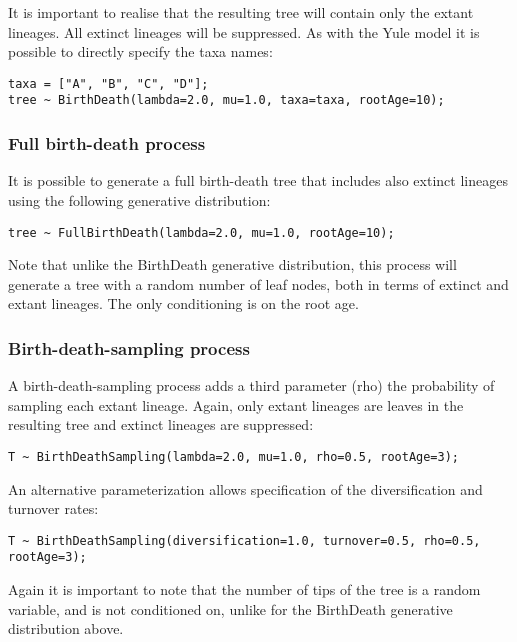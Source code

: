 \documentclass[oneside]{article}
\begin{document}
It is important to realise that the resulting tree will contain only the extant lineages. All extinct lineages will be
suppressed. As with the Yule model it is possible to directly specify the taxa names:

\begin{verbatim}
taxa = ["A", "B", "C", "D"];
tree ~ BirthDeath(lambda=2.0, mu=1.0, taxa=taxa, rootAge=10);
\end{verbatim}

\subsubsection{Full birth-death process}

It is possible to generate a full birth-death tree that includes also extinct lineages using the following generative
distribution:

\begin{verbatim}
tree ~ FullBirthDeath(lambda=2.0, mu=1.0, rootAge=10);
\end{verbatim}

Note that unlike the BirthDeath generative distribution, this process will generate a tree with a random number of
leaf nodes, both in terms of extinct and extant lineages. The only conditioning is on the root age.

\subsubsection{Birth-death-sampling process}

A birth-death-sampling process adds a third parameter (rho) the probability of sampling each extant lineage. Again,
only extant lineages are leaves in the resulting tree and extinct lineages are suppressed:

\begin{verbatim}
T ~ BirthDeathSampling(lambda=2.0, mu=1.0, rho=0.5, rootAge=3);
\end{verbatim}

An alternative parameterization allows specification of the diversification and turnover rates:

\begin{verbatim}
T ~ BirthDeathSampling(diversification=1.0, turnover=0.5, rho=0.5, rootAge=3);
\end{verbatim}

Again it is important to note that the number of tips of the tree is a random variable, and is not conditioned on,
unlike for the BirthDeath generative distribution above.
\end{document}
